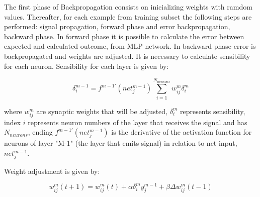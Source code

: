 The first phase of Backpropagation consists on inicializing weights with ramdom values. Thereafter, for each example from training subset the following steps are performed: signal propagation, forward phase and error backpropagation, backward phase. In forward phase it is possible to calculate the error between expected and calculated outcome, from MLP network. In backward phase error is backpropagated and weights are adjusted. It is necessary to calculate sensibility for each neuron. Sensibility for each layer is given by:

\begin{equation}
\label{eq:sensibiliy_function}
\delta^{m-1}_i = f^{m-1'}(net^{m-1}_j)\sum_{i=1}^{N_{neurons}}w^m_{ij}\delta^m_i
\end{equation}

where $w^m_{ij}$ are synaptic weights that will be adjusted, $\delta^m_i$ represents sensibility, index $i$ represents neuron numbers of the layer that receives the signal and has $N_{neurons}$, ending $f^{m-1'}(net^{m-1}_j)$ is the derivative of the activation function for neurons of layer "M-1" (the layer that emits signal) in relation to net input, $net^{m-1}_j$.

Weight adjustment is given by:

\begin{equation}
\label{eq:backpropagation_function}
w^m_{ij}(t+1) = w^m_{ij}(t) + \alpha \delta^m_i y^{m-1}_j + \beta \Delta w^m_{ij}(t-1)   
\end{equation}

